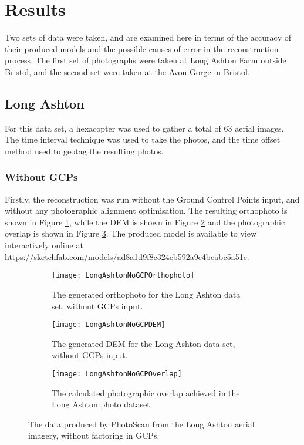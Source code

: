 \section{Results}

Two sets of data were taken, and are examined here in terms of the accuracy of
their produced models and the possible causes of error in the reconstruction
process. The first set of photographs were taken at Long Ashton Farm outside
Bristol, and the second set were taken at the Avon Gorge in Bristol.

\subsection{Long Ashton}

For this data set, a hexacopter was used to gather a total of 63 aerial images.
The time interval technique was used to take the photos, and the time offset
method used to geotag the resulting photos.

\subsubsection{Without GCPs}
\label{sec:results/long-ashton/no-gcp}

Firstly, the reconstruction was run without the Ground Control Points input, and
without any photographic alignment optimisation. The resulting orthophoto is
shown in Figure \ref{img:long-ashton/no-gcp/orthophoto}, while the DEM is shown
in Figure \ref{img:long-ashton/no-gcp/dem} and the photographic overlap is shown
in Figure \ref{img:long-ashton/no-gcp/overlap}. The produced model is available
to view interactively online at
\url{https://sketchfab.com/models/ad8a1d9f8c324eb592a9e4beabc5a51e}.

\begin{figure}
    \centering
    \begin{subfigure}[b]{0.3\textwidth}
        \texttt{[image: LongAshtonNoGCPOrthophoto]}
        \caption{The generated orthophoto for the Long Ashton data set, without
        GCPs input.}
        \label{img:long-ashton/no-gcp/orthophoto}
    \end{subfigure}
    \begin{subfigure}[b]{0.3\textwidth}
        \texttt{[image: LongAshtonNoGCPDEM]}
        \caption{The generated DEM for the Long Ashton data set, without GCPs
        input.}
        \label{img:long-ashton/no-gcp/dem}
    \end{subfigure}
    \begin{subfigure}[b]{0.3\textwidth}
        \texttt{[image: LongAshtonNoGCPOverlap]}
        \caption{The calculated photographic overlap achieved in the Long Ashton
        photo dataset.}
        \label{img:long-ashton/no-gcp/overlap}
    \end{subfigure}
    \caption{The data produced by PhotoScan from the Long Ashton aerial imagery,
    without factoring in GCPs.}
    \label{img:long-ashton/no-gcp}
\end{figure}

